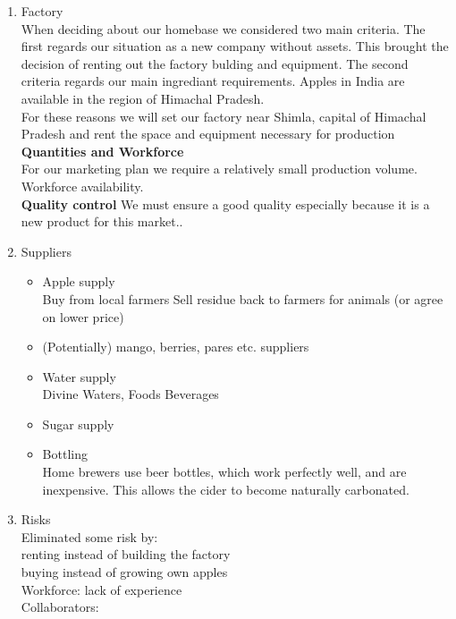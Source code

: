 \documentclass{article}
\begin{document}
	\begin{enumerate}
	\item Factory \\
When deciding about our homebase we considered two main criteria. The first regards our situation as a new company without assets. This brought the decision of renting out the factory bulding and equipment. The second criteria regards our main ingrediant requirements. Apples in India are available in the region of Himachal Pradesh. \\

For these reasons we will set our factory near Shimla, capital of Himachal Pradesh and rent the space and equipment necessary for production \\

\textbf{Quantities and Workforce} \\
For our marketing plan we require a relatively small production volume.\\
Workforce availability. \\

\textbf{Quality control}
We must ensure a good quality especially because it is a new product for this market..

	\item Suppliers
		\begin{itemize}
		\item Apple supply \\
			Buy from local farmers %
        	Sell residue back to farmers for animals (or agree on lower price)
		\item (Potentially) mango, berries, pares etc. suppliers
		\item Water supply \\
			Divine Waters, Foods Beverages
		\item Sugar supply %
		\item Bottling \\
			Home brewers use beer bottles, which work perfectly well, and are inexpensive. This allows the cider to become naturally carbonated.
		\end{itemize}
			
\item Risks \\
Eliminated some risk by:\\
	renting instead of building the factory\\
	buying instead of growing own apples\\
Workforce: lack of experience\\
Collaborators: \\
	\end{enumerate}
\end{document}
